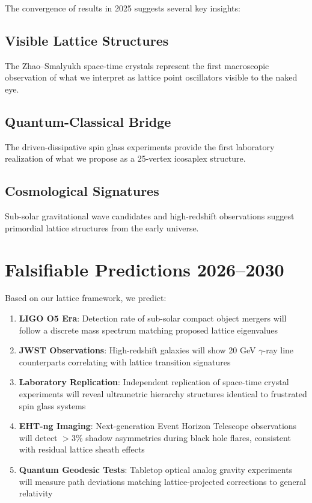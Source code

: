 \documentclass[11pt,a4paper]{article}
\begin{document}
The convergence of results in 2025 suggests several key insights:

\subsection{Visible Lattice Structures}
The Zhao--Smalyukh space-time crystals \cite{Zhao2025} represent the first macroscopic observation of what we interpret as lattice point oscillators visible to the naked eye.

\subsection{Quantum-Classical Bridge}
The driven-dissipative spin glass experiments provide the first laboratory realization of what we propose as a 25-vertex icosaplex structure.

\subsection{Cosmological Signatures}
Sub-solar gravitational wave candidates and high-redshift observations suggest primordial lattice structures from the early universe.

\section{Falsifiable Predictions 2026--2030}

Based on our lattice framework, we predict:

\begin{enumerate}
    \item \textbf{LIGO O5 Era}: Detection rate of sub-solar compact object mergers will follow a discrete mass spectrum matching proposed lattice eigenvalues
    
    \item \textbf{JWST Observations}: High-redshift galaxies will show 20 GeV $\gamma$-ray line counterparts correlating with lattice transition signatures
    
    \item \textbf{Laboratory Replication}: Independent replication of space-time crystal experiments will reveal ultrametric hierarchy structures identical to frustrated spin glass systems
    
    \item \textbf{EHT-ng Imaging}: Next-generation Event Horizon Telescope observations will detect $>3$\% shadow asymmetries during black hole flares, consistent with residual lattice sheath effects
    
    \item \textbf{Quantum Geodesic Tests}: Tabletop optical analog gravity experiments will measure path deviations matching lattice-projected corrections to general relativity
\end{enumerate}
\end{document}
